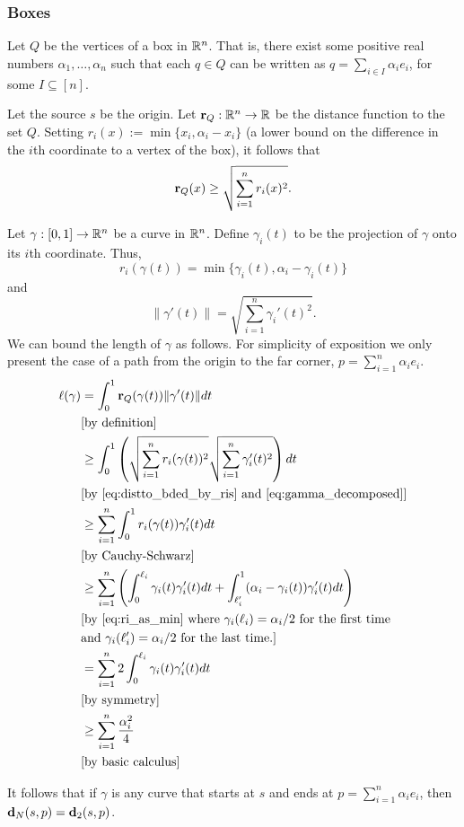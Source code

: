 
\subsubsection{Boxes} %
\label{sec:boxes}

  Let $Q$ be the vertices of a box in ${\mathbb R}^n$.
  That is, there exist some positive real numbers $\alpha_1,\ldots , \alpha_n$ such that each $q\in Q$ can be written as $q = \sum_{i\in I} \alpha_i e_i$, for some $I\subseteq [n]$.

  Let the source $s$ be the origin.
  Let $\mathbf{r}_Q:{\mathbb R}^n\to {\mathbb R}$ be the distance function to the set $Q$.
  Setting $r_i(x) := \min\{x_i, \alpha_i - x_i\}$ (a lower bound on the difference in the $i$th coordinate to a vertex of the box), it follows that
  \begin{equation}
    \label{eq:distto_bded_by_ris}
    \mathbf{r}_Q(x) \ge \sqrt{\sum_{i= 1}^n r_i(x)^2}.
  \end{equation}

  Let $\gamma:[0,1]\to {\mathbb R}^n$ be a curve in ${\mathbb R}^n$.
  Define $\gamma_i(t)$ to be the projection of $\gamma$ onto its $i$th coordinate.
  Thus,
  \begin{equation}\label{eq:ri_as_min}
    r_i(\gamma(t)) = \min\{\gamma_i(t), \alpha_i - \gamma_i(t)\}
  \end{equation}
  and
  \begin{equation}\label{eq:gamma_decomposed}
    \|\gamma'(t)\| = \sqrt{\sum_{i = 1}^n \gamma_i'(t)^2}.
  \end{equation}
  We can bound the length of $\gamma$ as follows. For simplicity of exposition we only present the case
  of a path from the origin to the far corner, $p = \sum_{i=1}^n \alpha_i e_i$. 
  \begin{align*}
    \ell(\gamma)
      &= \int_0^1 \mathbf{r}_Q(\gamma(t))\|\gamma'(t)\|dt \\
      & \text{[by definition]}\\
      &\ge \int_0^1 \left(\sqrt{\sum_{i= 1}^n r_i(\gamma(t))^2} \sqrt{\sum_{i = 1}^n \gamma_i'(t)^2}\right) dt \\
      & \text{[by \eqref{eq:distto_bded_by_ris} and \eqref{eq:gamma_decomposed}]}\\
      &\ge \sum_{i=1}^n \int_0^1 r_i(\gamma(t)) \gamma_i'(t) dt \\
      & \text{[by Cauchy-Schwarz]}\\
      &\ge \sum_{i=1}^n \left(\int_0^{\ell_i} \gamma_i(t) \gamma_i'(t)dt + \int_{\ell_i'}^1 (\alpha_i - \gamma_i(t)) \gamma_i'(t) dt\right) \\
      & \text{[by \eqref{eq:ri_as_min} where $\gamma_i(\ell_i) = \alpha_i/2$ for the first time} \\
      & \text{and $\gamma_i(\ell_i') = \alpha_i/2$ for the last time.]}\\
      &= \sum_{i=1}^n 2\int_0^{\ell_i} \gamma_i(t) \gamma_i'(t) dt \\
      & \text{[by symmetry]}\\
      &\ge \sum_{i=1}^n \frac{\alpha_i^2}{4} \\
      & \text{[by basic calculus]}
  \end{align*}

  It follows that if $\gamma$ is any curve that starts at $s$ and ends at $p = \sum_{i=1}^n \alpha_i e_i$, then $\mathbf{d}_N(s,p) = \mathbf{d}_2(s,p)$.


